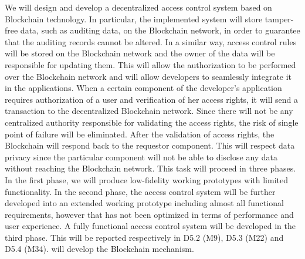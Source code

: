 \begin{Workpackage}{\thewpno}
\begin{Task}


\TaskResults{%
\ref{del:auth2},
\ref{del:auth3},
\ref{del:auth4}
}
\TaskHeader{}
We will design and develop a decentralized access control system based on Blockchain technology. In particular, the implemented system will store tamper-free data, such as auditing data, on the Blockchain network, in order to guarantee that the auditing records cannot be altered. In a similar way, access control rules will be stored on the Blockchain network and the owner of the data will be responsible for updating them. This will allow the authorization to be performed over the Blockchain network and will allow developers to seamlessly integrate it in the applications. When a certain component of the developer's application requires authorization of a user and verification of her access rights, it will send a transaction to the decentralized Blockchain network. Since there will not be any centralized authority responsible for validating the access rights, the risk of single point of failure will be eliminated. After the validation of access rights, the Blockchain will respond back to the requestor component. This will respect data privacy since the particular component will not be able to disclose any data without reaching the Blockchain network. This task will proceed in three phases. In the first phase, we will produce low-fidelity working prototypes with limited functionality. In the second phase, the access control system will be further developed into an extended working prototype including almost all functional requirements, however that has not been optimized in terms of performance and user experience. A fully functional access control system will be developed in the third phase. This will be reported respectively in D5.2 (M9), D5.3 (M22) and D5.4 (M34). \COGNIshort{} will develop the Blockchain mechanism.
\end{Task}


\begin{Task}
\TaskResults{%
\ref{del:auth2},
\ref{del:auth3},
\ref{del:auth4}
}
\TaskHeader{}


\end{Task}
\end{Workpackage}

